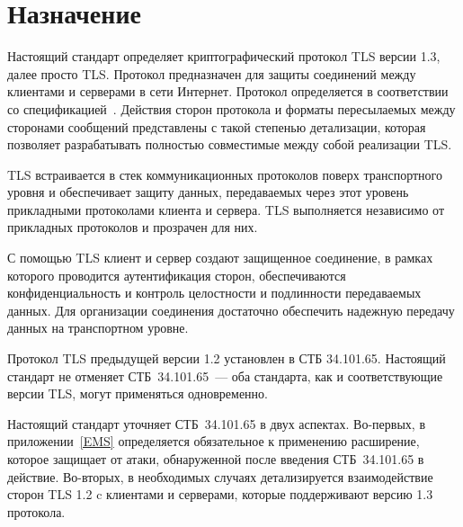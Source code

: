 \section{Назначение}\label{COMMON.Purpose}

Настоящий стандарт определяет криптографический протокол TLS версии 1.3,
далее просто TLS.
%
Протокол предназначен для защиты соединений между клиентами и серверами в сети 
Интернет.
%
Протокол определяется в соответствии со спецификацией~\cite{RFC8446}.
%
Действия сторон протокола и форматы пересылаемых между сторонами сообщений
представлены с такой степенью детализации, которая позволяет разрабатывать
полностью совместимые между собой реализации TLS.

TLS встраивается в стек коммуникационных протоколов поверх транспортного
уровня и обеспечивает защиту данных, передаваемых через этот уровень
прикладными протоколами клиента и сервера. TLS выполняется независимо от
прикладных протоколов и прозрачен для них.

С помощью TLS клиент и сервер создают защищенное соединение, в рамках которого
проводится аутентификация сторон, обеспечиваются конфиденциальность и контроль 
целостности и подлинности передаваемых данных.
%
Для организации соединения достаточно обеспечить надежную передачу данных на 
транспортном уровне.


Протокол TLS предыдущей версии 1.2 установлен в СТБ 34.101.65. 
%
Настоящий стандарт не отменяет СТБ~34.101.65~--- оба стандарта, как и 
соответствующие версии TLS, могут применяться одновременно. 


Настоящий стандарт уточняет СТБ~34.101.65 в двух аспектах. Во-первых, в 
приложении~\ref{EMS} определяется обязательное к применению расширение,
которое защищает от атаки, обнаруженной после введения СТБ~34.101.65 в действие.
%
Во-вторых, в необходимых случаях детализируется взаимодействие сторон TLS 1.2 
c клиентами и серверами, которые поддерживают версию 1.3 протокола.

